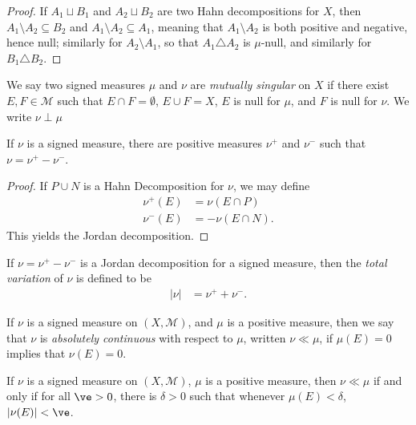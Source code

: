 \documentclass[10pt]{mypackage}
\begin{document}
\begin{proof}
  If $A_1\sqcup B_1$ and $A_2\sqcup B_2$ are two Hahn decompositions for $X$, then $A_1\setminus A_2 \subseteq B_2$ and $A_1\setminus A_2 \subseteq A_1$, meaning that $A_1\setminus A_2$ is both positive and negative, hence null; similarly for $A_2\setminus A_1$, so that $A_1\triangle A_2$ is $\mu$-null, and similarly for $B_1\triangle B_2$.
\end{proof}
\begin{definition}
  We say two signed measures $\mu$ and $\nu$ are \textit{mutually singular} on $X$ if there exist $E,F\in \mathcal{M}$ such that $E\cap F = \emptyset$, $E\cup F = X$, $E$ is null for $\mu$, and $F$ is null for $\nu$. We write $\nu\perp\mu$
\end{definition}
\begin{theorem}
  If $\nu$ is a signed measure, there are positive measures $\nu^{+}$ and $\nu^{-}$ such that $\nu = \nu^{+} - \nu^{-}$.
\end{theorem}
\begin{proof}
  If $P\cup N$ is a Hahn Decomposition for $\nu$, we may define
  \begin{align*}
    \nu^{+}(E) &= \nu\left( E\cap P \right)\\
    \nu^{-}(E) &= -\nu\left( E\cap N \right).
  \end{align*}
  This yields the Jordan decomposition.
\end{proof}
\begin{definition}
  If $\nu = \nu^{+} - \nu^{-}$ is a Jordan decomposition for a signed measure, then the \textit{total variation} of $\nu$ is defined to be
  \begin{align*}
    \left\vert \nu \right\vert &= \nu^{+} + \nu^{-}.
  \end{align*}
\end{definition}
\begin{definition}
  If $\nu$ is a signed measure on $\left( X,\mathcal{M} \right)$, and $\mu$ is a positive measure, then we say that $\nu$ is \textit{absolutely continuous} with respect to $\mu$, written $\nu\ll\mu$, if $\mu(E) = 0$ implies that $\nu(E) = 0$.
\end{definition}
\begin{proposition}
  If $\nu$ is a signed measure on $\left( X,\mathcal{M} \right)$, $\mu$ is a positive measure, then $\nu\ll\mu$ if and only if for all $\ve > 0$, there is $\delta > 0$ such that whenever $\mu\left( E \right) < \delta$, $\left\vert \nu(E) \right\vert < \ve$.
\end{proposition}
\end{document}
